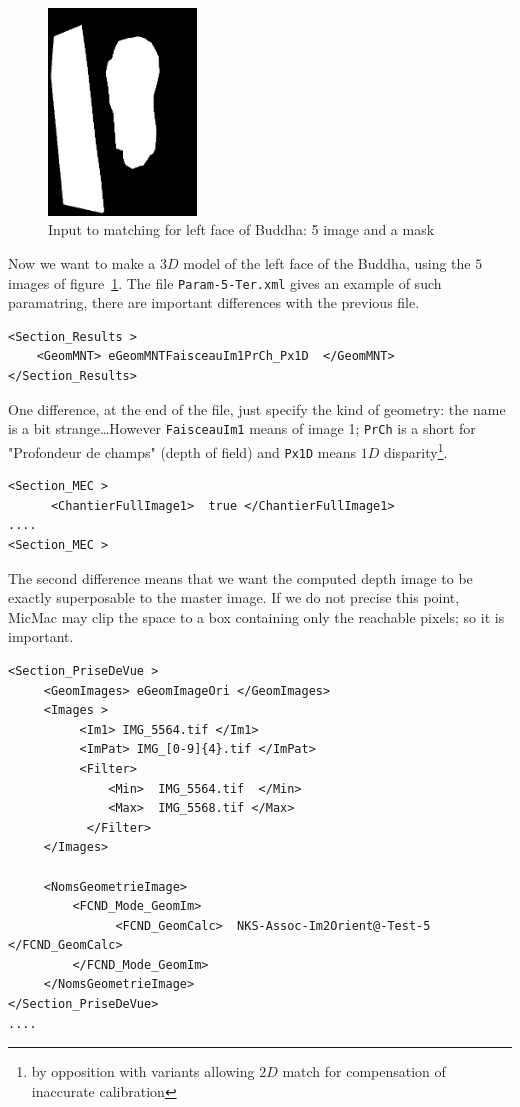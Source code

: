 \begin{figure}
\begin{center}
\includegraphics[height=55mm]{FIGS/Boudhas/IMG_5564_Masq.jpg}
\caption{Input to matching for left face of Buddha: 5 image and a mask}
\label{BOUDHA:GRIM:INPUT}
\end{center}
\end{figure}

Now we want to make a $3D$ model of the left face of the Buddha, using
the $5$ images of figure~\ref{BOUDHA:GRIM:INPUT}. The file {\tt Param-5-Ter.xml}
gives an example of such paramatring, there are important differences with the previous file.

{\scriptsize
\begin{verbatim}
<Section_Results >
    <GeomMNT> eGeomMNTFaisceauIm1PrCh_Px1D  </GeomMNT>
</Section_Results>
\end{verbatim}
}

One difference, at the end of the file, just specify the kind of geometry:
the name is a bit strange\dots However {\tt FaisceauIm1} means  of image 1;
{\tt PrCh} is a short for "Profondeur de champs" (depth of field) and {\tt Px1D}
means $1D$ disparity\footnote{by opposition with variants allowing $2D$ match for
compensation of inaccurate calibration}.


{\scriptsize
\begin{verbatim}
<Section_MEC >
      <ChantierFullImage1>  true </ChantierFullImage1>
....
<Section_MEC >
\end{verbatim}
}

The second difference means that we
want the computed depth image to be exactly superposable to the master image.
If we do not precise this point, MicMac may clip the space to a box containing
only the reachable pixels; so it is important.


{\scriptsize
\begin{verbatim}
<Section_PriseDeVue >
     <GeomImages> eGeomImageOri </GeomImages>
     <Images >
          <Im1> IMG_5564.tif </Im1>
          <ImPat> IMG_[0-9]{4}.tif </ImPat>
          <Filter>
              <Min>  IMG_5564.tif  </Min>
              <Max>  IMG_5568.tif </Max>
           </Filter>
     </Images>

     <NomsGeometrieImage>
         <FCND_Mode_GeomIm>
               <FCND_GeomCalc>  NKS-Assoc-Im2Orient@-Test-5  </FCND_GeomCalc>
         </FCND_Mode_GeomIm>
     </NomsGeometrieImage>
</Section_PriseDeVue>
....
\end{verbatim}
}

